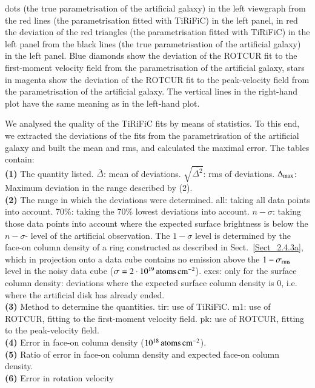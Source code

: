 \documentclass[oldversion]{aa}
\begin{document}
dots (the true parametrisation of the artificial galaxy) in the left
viewgraph from the red lines (the parametrisation fitted with TiRiFiC)
in the left panel, in red the deviation of the red
triangles (the parametrisation fitted with TiRiFiC) in the left
panel from the black lines (the true parametrisation of the artificial
galaxy) in the left panel. Blue diamonds show the deviation of the
ROTCUR fit to the first-moment velocity field from the parametrisation
of the artificial galaxy, stars in magenta show the deviation of the ROTCUR fit
to the peak-velocity field from the parametrisation of the artificial
galaxy. The vertical lines in the right-hand plot have the same
meaning as in the left-hand plot.

We analysed the quality of the TiRiFiC fits by means of
statistics. To this end, we extracted the deviations of the fits from the
parametrisation of the artificial galaxy and built the mean and rms, and
calculated the maximal error. The tables contain: \\
{\bf (1)} The
quantity listed. $\overline{\Delta}$: mean of
deviations. $\sqrt{\overline{\Delta^2}}$: rms of
deviations. $\Delta_{\rm max}$: Maximum deviation in the range
described by (2).\\ {\bf (2)} The range in which the deviations were
determined. all: taking all data points into account. 70\%: taking the
70\% lowest deviations into account. $n-\sigma$: taking those data
points into account where the expected surface brightness is below the
$n-\sigma$- level of the artificial observation. The $1-\sigma$ level is
determined by the face-on column density of a ring constructed as
described in Sect.~\ref{Sect_2.4.3a}, which in projection onto a data cube
contains no emission above the $1-\sigma_{\rm rms}$ level in the noisy
data cube ($\sigma = 2\cdot10^{19} \,{\rm atoms}\,{\rm
cm}^{-2}$). excs: only for the surface column density: deviations
where the expected surface column density is 0, i.e. where the artificial
disk has already ended.\\ {\bf (3)} Method to determine the
quantities. tir: use of TiRiFiC. m1: use of ROTCUR, fitting to the
first-moment velocity field. pk: use of ROTCUR, fitting to the peak-velocity field.\\ {\bf (4)} Error in face-on {} column
density ($10^{18}\,{\rm atoms}\,{\rm cm}^{-2}$).\\ {\bf (5)} Ratio of
error in face-on {} column density and expected face-on
{} column density.\\ {\bf (6)} Error in rotation velocity
\end{document}
